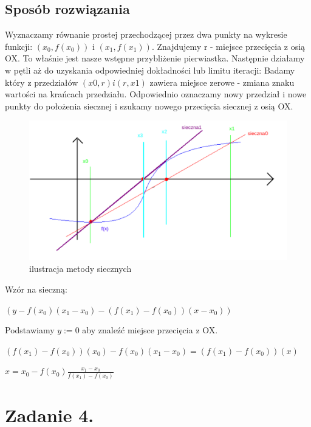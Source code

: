 \documentclass[12pt]{article}
\begin{document}
\subsection{Sposób rozwiązania}
Wyznaczamy równanie prostej przechodzącej przez dwa punkty na wykresie funkcji:
$(x_0, f(x_0))$ i $(x_1, f(x_1))$. Znajdujemy r - miejsce przecięcia z osią OX. To właśnie jest
nasze wstępne przybliżenie pierwiastka.\newline
Następnie działamy w pętli aż do uzyskania odpowiedniej dokładności lub limitu iteracji:\newline
Badamy który z przedziałów $(x0, r) i (r, x1)$ zawiera miejsce zerowe - zmiana znaku wartości na krańcach przedziału.
Odpowiednio oznaczamy nowy przedział i nowe punkty do położenia siecznej i szukamy nowego przecięcia siecznej z osią OX.
\newline
\begin{figure}[!h]
    \caption{ilustracja metody siecznych}
    \centering
    \includegraphics[width=14cm]{sieczne.png}
\end{figure}
Wzór na sieczną:
\begin{center}
    $(y - f(x_0)(x_1 - x_0) - (f(x_1) - f(x_0))(x - x_0))$
\end{center}
Podstawiamy $y := 0$ aby znaleźć miejsce przecięcia z OX.
\begin{center}
    $(f(x_1) - f(x_0))(x_0)-f(x_0)(x_1 - x_0) = (f(x_1) - f(x_0))(x)$
\end{center}
\begin{center}
    $x = x_0 - f(x_0) \frac{x_1 - x_0}{f(x_1) - f(x_0)}$
\end{center}
\newpage
\newpage
\section{Zadanie 4.}
\end{document}

